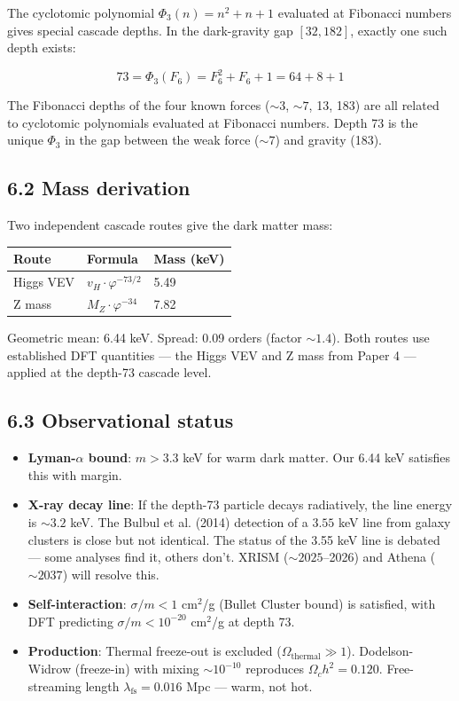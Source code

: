 \documentclass[11pt,a4paper]{article}
\providecommand{\tightlist}{\setlength{\itemsep}{0pt}\setlength{\parskip}{0pt}}
\begin{document}
The cyclotomic polynomial $\Phi_3(n) = n^2 + n + 1$ evaluated at Fibonacci numbers gives special cascade depths. In the dark-gravity gap $[32, 182]$, exactly one such depth exists:

\[73 = \Phi_3(F_6) = F_6^2 + F_6 + 1 = 64 + 8 + 1\]

The Fibonacci depths of the four known forces ($\sim 3$, $\sim 7$, 13, 183) are all related to cyclotomic polynomials evaluated at Fibonacci numbers. Depth 73 is the unique $\Phi_3$ in the gap between the weak force ($\sim 7$) and gravity (183).

\subsection*{6.2 Mass derivation}

Two independent cascade routes give the dark matter mass:

\begin{longtable}[]{@{}lll@{}}
\toprule
Route & Formula & Mass (keV) \\
\midrule\endhead
Higgs VEV & $v_H \cdot \varphi^{-73/2}$ & 5.49 \\
Z mass & $M_Z \cdot \varphi^{-34}$ & 7.82 \\
\bottomrule
\end{longtable}

Geometric mean: 6.44 keV. Spread: 0.09 orders (factor $\sim 1.4$). Both routes use established DFT quantities — the Higgs VEV and Z mass from Paper 4 — applied at the depth-73 cascade level.

\subsection*{6.3 Observational status}

\begin{itemize}\tightlist
\item \textbf{Lyman-$\alpha$ bound}: $m > 3.3$ keV for warm dark matter. Our 6.44 keV satisfies this with margin.
\item \textbf{X-ray decay line}: If the depth-73 particle decays radiatively, the line energy is $\sim 3.2$ keV. The Bulbul et al. (2014) detection of a $3.55$ keV line from galaxy clusters is close but not identical. The status of the 3.55 keV line is debated — some analyses find it, others don't. XRISM ($\sim 2025$–2026) and Athena ($\sim 2037$) will resolve this.
\item \textbf{Self-interaction}: $\sigma/m < 1$ cm$^2$/g (Bullet Cluster bound) is satisfied, with DFT predicting $\sigma/m < 10^{-20}$ cm$^2$/g at depth 73.
\item \textbf{Production}: Thermal freeze-out is excluded ($\Omega_{\text{thermal}} \gg 1$). Dodelson-Widrow (freeze-in) with mixing $\sim 10^{-10}$ reproduces $\Omega_c h^2 = 0.120$. Free-streaming length $\lambda_{\text{fs}} = 0.016$ Mpc — warm, not hot.
\end{itemize}
\end{document}
